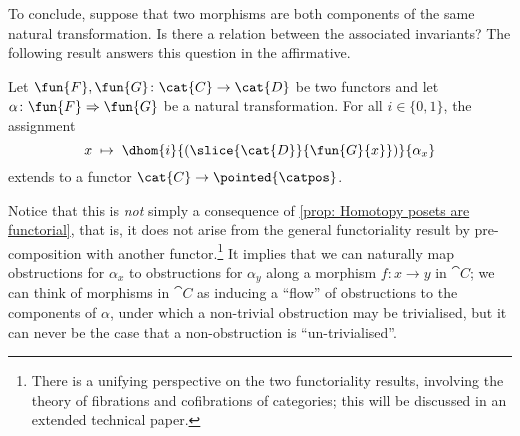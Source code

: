 %
%
To conclude, suppose that two morphisms are both components of the same natural transformation.
Is there a relation between the associated invariants?
The following result answers this question in the affirmative.
%
%
\begin{proposition} \label{prop: covariance natural transformation}
Let $\fun{F}, \fun{G}\colon \cat{C} \to \cat{D}$ be two functors and let $\alpha\colon \fun{F} \Rightarrow \fun{G}$ be a natural transformation.
For all $i \in \{ 0, 1\}$, the assignment
\begin{equation*}
    x \; \mapsto \; \dhom{i}{(\slice{\cat{D}}{\fun{G}{x}})}{\alpha_x}
\end{equation*}
extends to a functor $\cat{C} \to \pointed{\catpos}$.
\end{proposition}
%
%
Notice that this is \emph{not} simply a consequence of \autoref{prop: Homotopy posets are functorial}, that is, it does not arise from the general functoriality result by pre-composition with another functor.\footnote{There is a unifying perspective on the two functoriality results, involving the theory of fibrations and cofibrations of categories; this will be discussed in an extended technical paper.}
It implies that we can naturally map obstructions for $\alpha_x$ to obstructions for $\alpha_y$ along a morphism $f\colon x \to y$ in $\cat{C}$; we can think of morphisms in $\cat{C}$ as inducing a ``flow'' of obstructions to the components of $\alpha$, under which a non-trivial obstruction may be trivialised, but it can never be the case that a non-obstruction is ``un-trivialised''.
